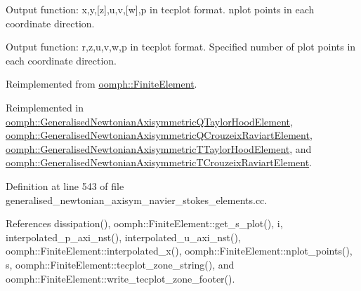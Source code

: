 Output function\+: x,y,\mbox{[}z\mbox{]},u,v,\mbox{[}w\mbox{]},p in tecplot format. nplot points in each coordinate direction. 

Output function\+: r,z,u,v,w,p in tecplot format. Specified number of plot points in each coordinate direction. 

Reimplemented from \hyperlink{classoomph_1_1FiniteElement_adfaee690bb0608f03320eeb9d110d48c}{oomph\+::\+Finite\+Element}.



Reimplemented in \hyperlink{classoomph_1_1GeneralisedNewtonianAxisymmetricQTaylorHoodElement_a20ac0d0543f6f277139e526022edd5fd}{oomph\+::\+Generalised\+Newtonian\+Axisymmetric\+Q\+Taylor\+Hood\+Element}, \hyperlink{classoomph_1_1GeneralisedNewtonianAxisymmetricQCrouzeixRaviartElement_ad5949f8a416c48a56e82a154d9a9bfbe}{oomph\+::\+Generalised\+Newtonian\+Axisymmetric\+Q\+Crouzeix\+Raviart\+Element}, \hyperlink{classoomph_1_1GeneralisedNewtonianAxisymmetricTTaylorHoodElement_a52f26763af5a245e6bd5b578abf16095}{oomph\+::\+Generalised\+Newtonian\+Axisymmetric\+T\+Taylor\+Hood\+Element}, and \hyperlink{classoomph_1_1GeneralisedNewtonianAxisymmetricTCrouzeixRaviartElement_a09c3f2cc2d733be8b96daa8e8f8b90cd}{oomph\+::\+Generalised\+Newtonian\+Axisymmetric\+T\+Crouzeix\+Raviart\+Element}.



Definition at line 543 of file generalised\+\_\+newtonian\+\_\+axisym\+\_\+navier\+\_\+stokes\+\_\+elements.\+cc.



References dissipation(), oomph\+::\+Finite\+Element\+::get\+\_\+s\+\_\+plot(), i, interpolated\+\_\+p\+\_\+axi\+\_\+nst(), interpolated\+\_\+u\+\_\+axi\+\_\+nst(), oomph\+::\+Finite\+Element\+::interpolated\+\_\+x(), oomph\+::\+Finite\+Element\+::nplot\+\_\+points(), s, oomph\+::\+Finite\+Element\+::tecplot\+\_\+zone\+\_\+string(), and oomph\+::\+Finite\+Element\+::write\+\_\+tecplot\+\_\+zone\+\_\+footer().

\mbox{\label{classoomph_1_1GeneralisedNewtonianAxisymmetricNavierStokesEquations_a7aca4266760477bee257a2509b136686}} 
